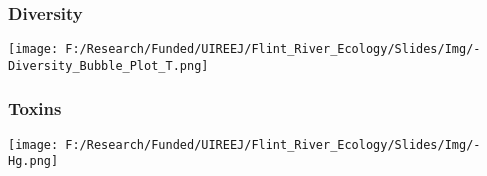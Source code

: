 \documentclass[10pt]{beamer}
\begin{document}



\begin{frame}
    \frametitle{Diversity} %
    \begin{center} 
        \texttt{[image: F:/Research/Funded/UIREEJ/Flint\_River\_Ecology/Slides/Img/-Diversity\_Bubble\_Plot\_T.png]} \\
    \end{center}
    
\end{frame}



\begin{frame}
    \frametitle{Toxins} %
    \begin{center}
        \texttt{[image: F:/Research/Funded/UIREEJ/Flint\_River\_Ecology/Slides/Img/-Hg.png]} \\
    \end{center}
    
\end{frame}
\end{document}
